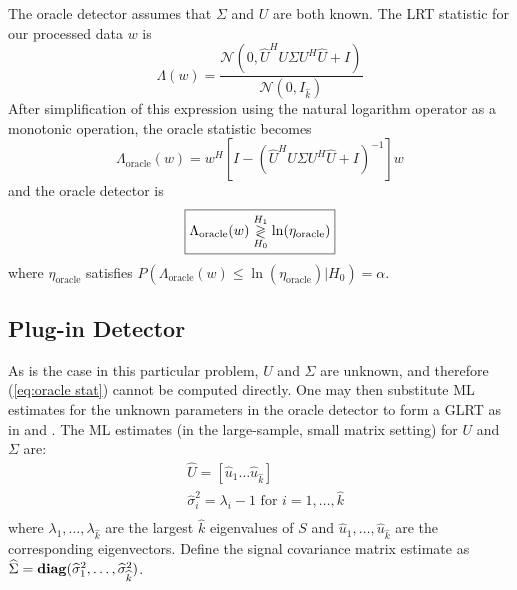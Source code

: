The oracle detector assumes that $\Sigma$ and $U$ are both known. The LRT statistic for our processed data $w$ is
\begin{equation*}
\Lambda(w)=\frac{\mathcal{N}(0,\widehat{U}^HU\Sigma U^H\widehat{U} +I)}{\mathcal{N}(0,I_{\widehat{k}})}
\end{equation*}
After simplification of this expression using the natural logarithm operator as a monotonic operation, the oracle statistic becomes
\begin{equation}\label{eq:oracle stat}
\boxed{\Lambda_{\text{oracle}}(w) = w^H\left[I-\left(\widehat{U}^HU\Sigma U^H\widehat{U}+I\right)^{-1}\right]w}
\end{equation}
and the oracle detector is
\begin{equation}\label{eq:oracle classifier}
\boxed{\Lambda_{\text{oracle}}(w) \detgtrless \ln(\eta_{\text{oracle}})}
\end{equation}
where $\eta_{\text{oracle}}$ satisfies $P(\Lambda_{\text{oracle}}(w)\leq\ln\left(\eta_{\text{oracle}}\right)|H_0)=\alpha$.

\subsection{Plug-in Detector}\label{sec:plugin}

As is the case in this particular problem, $U$ and $\Sigma$ are unknown, and therefore (\ref{eq:oracle stat}) cannot be computed directly. One may then substitute ML estimates for the unknown parameters in the oracle detector to form a GLRT as in \cite{jin2005cfar} and \cite{mcwhorter2003matched}. The ML estimates (in the large-sample, small matrix setting) for $U$ and $\Sigma$ are:
\begin{equation}\label{eq:param estims}
\begin{aligned}
&\widehat{U}=[\widehat{u}_1 \dots \widehat{u}_{\widehat{k}}]\\
&\widehat{\sigma}_i^2 = \lambda_i -1 \text{ for } i=1,\dots,\widehat{k}\\
\end{aligned}
\end{equation}
where $\lambda_1,\dots,\lambda_{\widehat{k}}$ are the largest $\widehat{k}$ eigenvalues of $S$ and $\widehat{u}_1,\dots,\widehat{u}_{\widehat{k}}$ are the corresponding eigenvectors. Define the signal covariance matrix estimate as $\widehat{\Sigma}=\mathop{\bf diag}(\widehat{\sigma}_1^2,\dots,\widehat{\sigma}_{\widehat{k}}^2)$.

